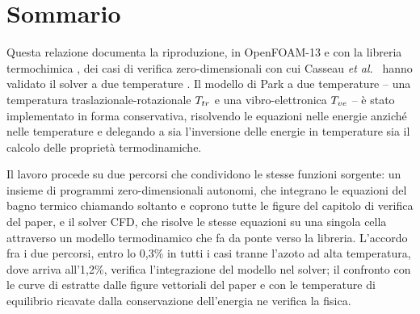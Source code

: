 \section*{Sommario}

Questa relazione documenta la riproduzione, in OpenFOAM-13 e con la libreria
termochimica \mpp, dei casi di verifica zero-dimensionali con cui Casseau
\textit{et al.}~\cite{casseau2016} hanno validato il solver a due temperature
\hyfoam. Il modello di Park a due temperature -- una temperatura
traslazionale-rotazionale $T_{tr}$ e una vibro-elettronica $T_{ve}$ -- è stato
implementato in forma conservativa, risolvendo le equazioni nelle energie
anziché nelle temperature e delegando a \mpp{} sia l'inversione delle energie
in temperature sia il calcolo delle proprietà termodinamiche.

Il lavoro procede su due percorsi che condividono le stesse funzioni sorgente:
un insieme di programmi zero-dimensionali autonomi, che integrano le equazioni
del bagno termico chiamando soltanto \mpp{} e coprono tutte le figure del
capitolo di verifica del paper, e il solver CFD, che risolve le stesse equazioni su una singola cella
attraverso un modello termodinamico che fa da ponte verso la libreria. L'accordo fra i due percorsi, entro lo 0{,}3\% in
tutti i casi tranne l'azoto ad alta temperatura, dove arriva all'1{,}2\%, verifica l'integrazione del modello nel solver; il confronto
con le curve di \hyfoam{} estratte dalle figure vettoriali del paper e con le
temperature di equilibrio ricavate dalla conservazione dell'energia ne verifica
la fisica.
